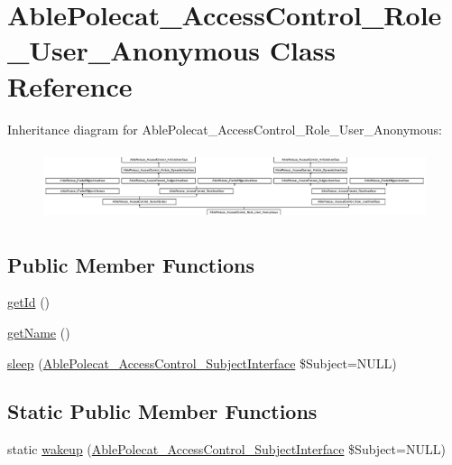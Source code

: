 \hypertarget{class_able_polecat___access_control___role___user___anonymous}{}\section{Able\+Polecat\+\_\+\+Access\+Control\+\_\+\+Role\+\_\+\+User\+\_\+\+Anonymous Class Reference}
\label{class_able_polecat___access_control___role___user___anonymous}
Inheritance diagram for Able\+Polecat\+\_\+\+Access\+Control\+\_\+\+Role\+\_\+\+User\+\_\+\+Anonymous\+:\begin{figure}[H]
\begin{center}
\leavevmode
\includegraphics[height=2.048780cm]{class_able_polecat___access_control___role___user___anonymous}
\end{center}
\end{figure}
\subsection*{Public Member Functions}
\begin{DoxyCompactItemize}
\item 
\hyperlink{class_able_polecat___access_control___role___user___anonymous_a12251d0c022e9e21c137a105ff683f13}{get\+Id} ()
\item 
\hyperlink{class_able_polecat___access_control___role___user___anonymous_a3d0963e68bb313b163a73f2803c64600}{get\+Name} ()
\item 
\hyperlink{class_able_polecat___access_control___role___user___anonymous_a365e24d7b066205cafa2a5cce3a4f224}{sleep} (\hyperlink{interface_able_polecat___access_control___subject_interface}{Able\+Polecat\+\_\+\+Access\+Control\+\_\+\+Subject\+Interface} \$Subject=N\+U\+L\+L)
\end{DoxyCompactItemize}
\subsection*{Static Public Member Functions}
\begin{DoxyCompactItemize}
\item 
static \hyperlink{class_able_polecat___access_control___role___user___anonymous_a3f2135f6ad45f51d075657f6d20db2cd}{wakeup} (\hyperlink{interface_able_polecat___access_control___subject_interface}{Able\+Polecat\+\_\+\+Access\+Control\+\_\+\+Subject\+Interface} \$Subject=N\+U\+L\+L)
\end{DoxyCompactItemize}
